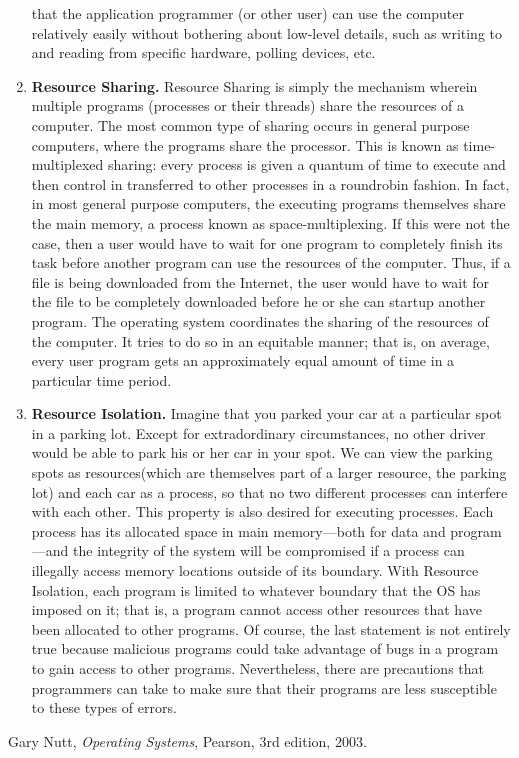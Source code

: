 \documentclass[9pt]{article}
\begin{document}
\begin{enumerate}
         that the application programmer (or other user) can use the computer
         relatively easily without bothering about low-level details, such as
         writing to and reading from specific hardware, polling devices, etc.
   \item \textbf{Resource Sharing.} Resource Sharing is simply the mechanism
         wherein multiple programs (processes or their threads) share the
         resources of a computer. The most common type of sharing occurs in
         general purpose computers, where the programs share the processor. This
         is known as time-multiplexed sharing: every process is given a quantum
         of time to execute and then control in transferred to other processes
         in a roundrobin fashion. In fact, in most general purpose computers,
         the executing programs themselves share the main memory, a process
         known as space-multiplexing. If this were
         not the case, then a user would have to wait for one program to
         completely finish its task before another program can use the resources
         of the computer. Thus, if a file is being downloaded from the Internet,
         the user would have to wait for the file to be completely downloaded
         before he or she can startup another program. The operating system
         coordinates the sharing of the resources of the computer. It tries to
         do so in an equitable manner; that is, on average, every user program
         gets an approximately equal amount of time in a particular time period.
   \item \textbf{Resource Isolation.} Imagine that you parked your car at a
         particular spot in a parking lot. Except for extradordinary
         circumstances, no other driver would be able to park his or her car in
         your spot. We can view the parking spots as resources(which are
         themselves part of a larger resource, the parking lot) and each car as
         a process, so that no two different processes can interfere with each
         other. This property is also desired for executing processes. Each
         process has its allocated space in main memory---both for data and
         program---and the integrity of the system will be compromised if a
         process can illegally access memory locations outside of its boundary.
         With Resource Isolation, each program is limited to whatever boundary
         that the OS has imposed on it; that is, a program cannot access other
         resources that have been allocated to other programs. Of course, the
         last statement is not entirely true because malicious programs could
         take advantage of bugs in a program to gain access to other programs.
         Nevertheless, there are precautions that programmers can take to make
         sure that their programs are less susceptible to these types of errors.
\end{enumerate}

\begin{thebibliography}{9}

  Gary Nutt,
  \emph{Operating Systems},
  Pearson,
  3rd edition,
  2003.

\end{thebibliography}
\end{document}
